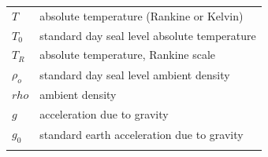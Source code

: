 \documentclass[
]{book}
\begin{document}
\begin{longtable}[]{@{}ll@{}}
\begin{minipage}[t]{0.21\columnwidth}\raggedright
\(T\)\strut
\end{minipage} & \begin{minipage}[t]{0.73\columnwidth}\raggedright
absolute temperature (Rankine or Kelvin)\strut
\end{minipage}\tabularnewline
\begin{minipage}[t]{0.21\columnwidth}\raggedright
\(T_0\)\strut
\end{minipage} & \begin{minipage}[t]{0.73\columnwidth}\raggedright
standard day seal level absolute temperature\strut
\end{minipage}\tabularnewline
\begin{minipage}[t]{0.21\columnwidth}\raggedright
\(T_R\)\strut
\end{minipage} & \begin{minipage}[t]{0.73\columnwidth}\raggedright
absolute temperature, Rankine scale\strut
\end{minipage}\tabularnewline
\begin{minipage}[t]{0.21\columnwidth}\raggedright
\(\rho_ο\)\strut
\end{minipage} & \begin{minipage}[t]{0.73\columnwidth}\raggedright
standard day seal level ambient density\strut
\end{minipage}\tabularnewline
\begin{minipage}[t]{0.21\columnwidth}\raggedright
\(rho\)\strut
\end{minipage} & \begin{minipage}[t]{0.73\columnwidth}\raggedright
ambient density\strut
\end{minipage}\tabularnewline
\begin{minipage}[t]{0.21\columnwidth}\raggedright
\(g\)\strut
\end{minipage} & \begin{minipage}[t]{0.73\columnwidth}\raggedright
acceleration due to gravity\strut
\end{minipage}\tabularnewline
\begin{minipage}[t]{0.21\columnwidth}\raggedright
\(g_0\)\strut
\end{minipage} & \begin{minipage}[t]{0.73\columnwidth}\raggedright
standard earth acceleration due to gravity\strut
\end{minipage}\tabularnewline
\begin{minipage}[t]{0.21\columnwidth}\raggedright

\end{minipage}
\end{longtable}
\end{document}
